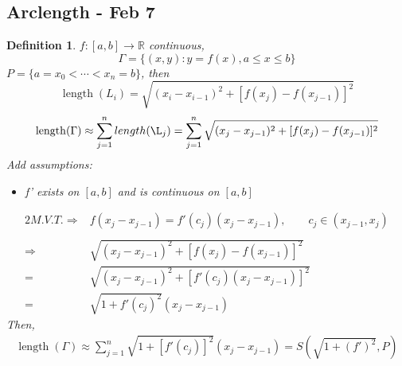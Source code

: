 \documentclass[12pt]{article}
\theoremstyle{plain}
\newtheorem{definition}{Definition}[subsection]
\newcommand{\mR}{{\mathbb{R}}}
\DeclareMathOperator{\Length}{length}
\begin{document}
{\begin{figure}[htbp]
	\centering
\end{figure}


		\begin{figure}[htbp]
		\centering
	\end{figure}
}


\newpage
\subsection{Arclength - Feb 7}
\begin{definition}
	$f:[a,b]\to \mR$ continuous,
	\[
		\Gamma = \{(x,y): y = f(x), a\leq x \leq b\}
	\]
	$P = \{a = x_0 < \cdots < x_n = b\}$, then 
	\[
		\Length(L_i) = \sqrt{(x_i-x_{i-1})^2 + [f(x_j)-f(x_{j-1})]^2}
	\]
	\[
		\Length(\Gamma) \approx \sum_{j=1}^n length(\L_j) 
		=\sum_{j=1}^n \sqrt{(x_j-x_{j-1})^2 + [f(x_j)-f(x_{j-1})]^2}
	\]
	Add assumptions: 
	\begin{itemize}
		\item f' exists on $[a,b]$ and is continuous on $[a,b]$
	\end{itemize}
	
	\begin{alignat*}{2} 
		M.V.T.
		\Rightarrow &f(x_j-x_{j-1}) = f'(c_j) (x_j-x_{j-1}), \qquad
		c_j\in (x_{j-1}, x_j)\\\\
		\Rightarrow &\sqrt{(x_j-x_{j-1})^2 + [f(x_j)-f(x_{j-1})]^2}\\
			=& \sqrt{(x_j-x_{j-1})^2 + [f'(c_j)(x_j-x_{j-1})]^2}\\
			=& \sqrt{1+f'(c_j)^2}(x_j-x_{j-1})
	\end{alignat*}
	Then, 
	\begin{align*}
		\Length(\Gamma) \approx \sum_{j=1}^n \sqrt{1+[f'(c_j)]^2}
		(x_j-x_{j-1})= S(\sqrt{1+(f')^2}, P)
	\end{align*}
\end{definition}
\end{document}
